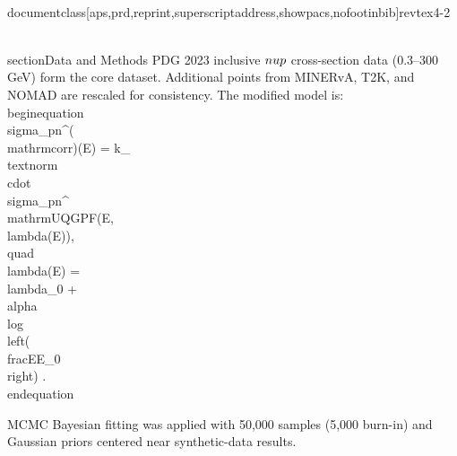 \\documentclass[aps,prd,reprint,superscriptaddress,showpacs,nofootinbib]{revtex4-2}
\begin{document}
\\section{Data and Methods}
PDG 2023 inclusive $\\nu p$ cross-section data ($0.3$--$300$ GeV) form the core dataset. Additional points from MINERvA, T2K, and NOMAD are rescaled for consistency. The modified model is:
\\begin{equation}
    \\sigma_{pn}^{(\\mathrm{corr})}(E) = k_{\\text{norm}} \\cdot \\sigma_{pn}^{\\mathrm{UQGPF}}(E, \\lambda(E)), \\quad \\lambda(E) = \\lambda_0 + \\alpha \\log \\left( \\frac{E}{E_0} \\right) .
\\end{equation}

MCMC Bayesian fitting was applied with 50,000 samples (5,000 burn-in) and Gaussian priors centered near synthetic-data results.
\end{document}
